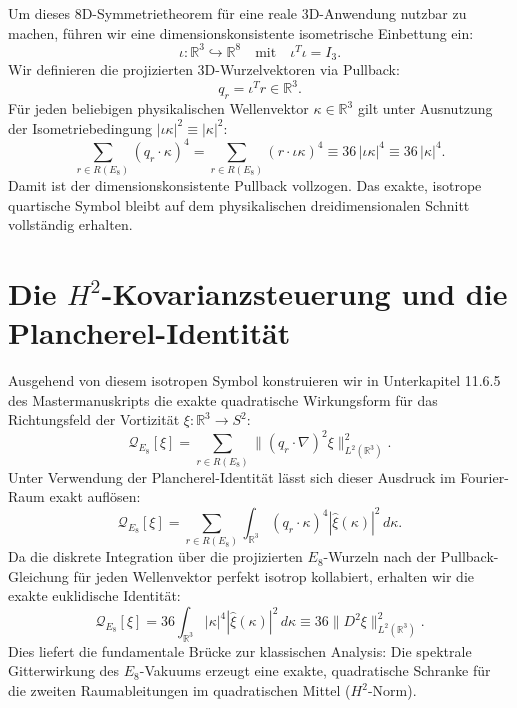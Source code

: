 \documentclass[11pt,twoside,a4paper]{article}
\begin{document}
	Um dieses 8D-Symmetrietheorem für eine reale 3D-Anwendung nutzbar zu machen, führen wir eine dimensionskonsistente isometrische Einbettung ein:
	\begin{equation}
		\iota: \mathbb{R}^3 \hookrightarrow \mathbb{R}^8 \quad \text{mit} \quad \iota^T \iota = I_3.
	\end{equation}
	Wir definieren die projizierten 3D-Wurzelvektoren via Pullback:
	\begin{equation}
		q_r = \iota^T r \in \mathbb{R}^3.
	\end{equation}
	Für jeden beliebigen physikalischen Wellenvektor $\kappa \in \mathbb{R}^3$ gilt unter Ausnutzung der Isometriebedingung $|\iota \kappa|^2 \equiv |\kappa|^2$:
	\begin{equation}
		\sum_{r \in R(E_8)} (q_r \cdot \kappa)^4 = \sum_{r \in R(E_8)} (r \cdot \iota \kappa)^4 \equiv 36 \, |\iota \kappa|^4 \equiv 36 \, |\kappa|^4.
	\end{equation}
	Damit ist der dimensionskonsistente Pullback vollzogen. Das exakte, isotrope quartische Symbol bleibt auf dem physikalischen dreidimensionalen Schnitt vollständig erhalten.
	
	\section{Die $H^2$-Kovarianzsteuerung und die Plancherel-Identität}
	Ausgehend von diesem isotropen Symbol konstruieren wir in Unterkapitel 11.6.5 des Mastermanuskripts die exakte quadratische Wirkungsform für das Richtungsfeld der Vortizität $\xi: \mathbb{R}^3 \to S^2$:
	\begin{equation}
		\mathcal{Q}_{E_8}[\xi] = \sum_{r \in R(E_8)} \|(q_r \cdot \nabla)^2 \xi\|_{L^2(\mathbb{R}^3)}^2.
	\end{equation}
	Unter Verwendung der Plancherel-Identität lässt sich dieser Ausdruck im Fourier-Raum exakt auflösen:
	\begin{equation}
		\mathcal{Q}_{E_8}[\xi] = \sum_{r \in R(E_8)} \int_{\mathbb{R}^3} (q_r \cdot \kappa)^4 |\widehat{\xi}(\kappa)|^2 \, d\kappa.
	\end{equation}
	Da die diskrete Integration über die projizierten $E_8$-Wurzeln nach der Pullback-Gleichung für jeden Wellenvektor perfekt isotrop kollabiert, erhalten wir die exakte euklidische Identität:
	\begin{equation}
		\mathcal{Q}_{E_8}[\xi] = 36 \int_{\mathbb{R}^3} |\kappa|^4 |\widehat{\xi}(\kappa)|^2 \, d\kappa \equiv 36 \|D^2 \xi\|_{L^2(\mathbb{R}^3)}^2.
	\end{equation}
	Dies liefert die fundamentale Brücke zur klassischen Analysis: Die spektrale Gitterwirkung des $E_8$-Vakuums erzeugt eine exakte, quadratische Schranke für die zweiten Raumableitungen im quadratischen Mittel ($H^2$-Norm).
	
\end{document}
